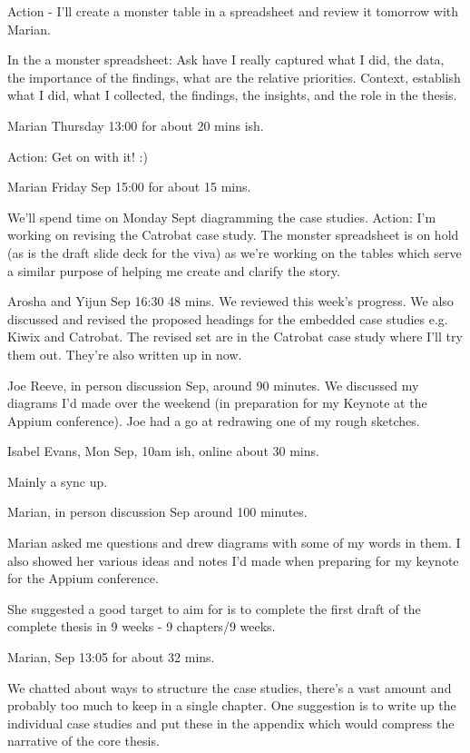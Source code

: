 Action - I'll create a monster table in a spreadsheet and review it tomorrow with Marian.

In the a monster spreadsheet: Ask have I really captured what I did, the data, the importance of the findings, what are the relative priorities. Context, establish what I did, what I collected, the findings, the insights, and the role in the thesis. 

\dotfill
Marian Thursday 13:00 for about 20 mins ish.

Action: Get on with it! :)

\dotfill
Marian Friday  Sep 15:00 for about 15 mins.

We'll spend time on Monday  Sept diagramming the case studies. 
Action: I'm working on revising the Catrobat case study. The monster spreadsheet is on hold (as is the draft slide deck for the viva) as we're working on the tables which serve a similar purpose of helping me create and clarify the story.

\dotfill
Arosha and Yijun  Sep 16:30 48 mins.
We reviewed this week's progress. 
We also discussed and revised the proposed headings for the embedded case studies e.g. Kiwix and Catrobat. The revised set are in the Catrobat case study where I'll try them out. They're also written up in \href{structure-of-the-app-case-studies}{} now.

\dotfill
Joe Reeve, in person discussion  Sep, around 90 minutes.
We discussed my diagrams I'd made over the weekend (in preparation for my Keynote at the Appium conference). Joe had a go at redrawing one of my rough sketches. 

\dotfill
Isabel Evans, Mon  Sep, 10am ish, online about 30 mins.

Mainly a sync up.

\dotfill
Marian, in person discussion  Sep around 100 minutes.

Marian asked me questions and drew diagrams with some of my words in them. I also showed her various ideas and notes I'd made when preparing for my keynote for the Appium conference.

She suggested a good target to aim for is to complete the first draft of the complete thesis in 9 weeks - 9 chapters/9 weeks.

\dotfill
Marian,  Sep 13:05 for about 32 mins.

We chatted about ways to structure the case studies, there's a vast amount and probably too much to keep in a single chapter. One suggestion is to write up the individual case studies and put these in the appendix which would compress the narrative of the core thesis.

